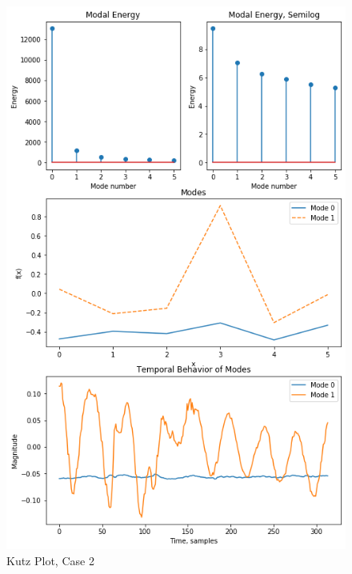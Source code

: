 \documentclass[journal]{IEEEtran}
\begin{document}
\begin{figure}
	\centerline{\includegraphics[width=\columnwidth]{kutz2.png}}
	\caption{Kutz Plot, Case 2}
	\label{kutz2}
\end{figure}
\end{document}
